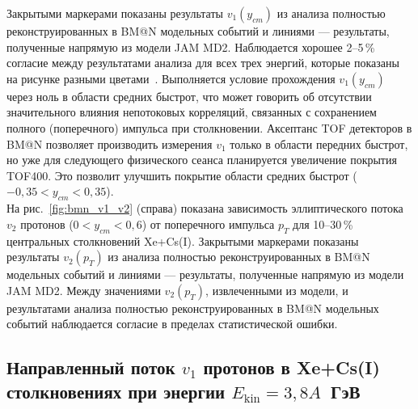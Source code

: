 Закрытыми маркерами показаны результаты $v_1(y_{cm})$ из анализа полностью реконструированных в BM@N модельных событий и  линиями --- результаты, полученные напрямую из модели  JAM MD2.
Наблюдается хорошее 2--5\,\%  согласие между результатами анализа для всех трех энергий, которые показаны на рисунке разными цветами~\cite{Mamaev:2023yhz,Mamaev:2024}. 
Выполняется  условие прохождения $v_1(y_{cm})$ через ноль в области средних быстрот, что может говорить об отсутствии значительного влияния непотоковых корреляций, связанных с
сохранением полного (поперечного) импульса при столкновении. Аксептанс TOF детекторов в BM@N позволяет производить измерения $v_1$ только в области передних быстрот, но уже для
следующего физического сеанса планируется увеличение покрытия TOF400. Это позволит улучшить покрытие области средних быстрот ($-0,35 < y_{cm} < 0,35$).\\
На рис.~\ref{fig:bmn_v1_v2} (справа) показана зависимость эллиптического потока $v_2$ протонов ($0 < y_{cm} < 0,6$) от поперечного импульса $p_T$ для 10--30\,\% центральных столкновений  Xe+Cs(I). 
Закрытыми маркерами показаны результаты $v_2(p_{T})$ из анализа полностью реконструированных в BM@N модельных событий и  линиями --- результаты, полученные напрямую из модели  JAM MD2.
Между значениями $v_2(p_{T})$, извлеченными из модели, и результатами анализа полностью реконструированных в BM@N модельных событий 
наблюдается  согласие в пределах статистической ошибки. 

\subsection{Направленный поток $v_1$ протонов в Xe+Cs(I) столкновениях при энергии $E_{\mathrm{kin}}=3,8A$~ГэВ}

